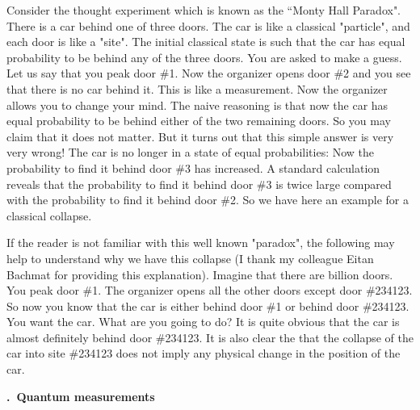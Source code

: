 \documentclass[onecolumn,fleqn, 11pt]{revtex4}
\renewcommand{\thesubsection}{\arabic{subsection}}
\renewcommand{\thesubsubsection}{\arabic{subsubsection}}
\newcommand{\sheadC}[1]
{
\addtocounter{subsubsection}{1}
\vspace{5mm}
{\bf \thesubsection.\thesubsubsection \ #1}  
\nopagebreak
\phantomsection
}
\begin{document}
Consider the thought experiment 
which is known as the ``Monty Hall Paradox".
There is a car behind one of three doors. 
The car is like a classical "particle", 
and each door is like a "site". 
The initial classical state is such that 
the car has equal probability to be behind 
any of the three doors. You are asked to make a guess.
Let us say that you peak door \#1. Now the organizer 
opens door \#2 and you see that there is no car behind it. 
This is like a measurement. Now the organizer allows 
you to change your mind. The naive reasoning is that 
now the car has equal probability to be behind either 
of the two remaining doors. So you may claim that 
it does not matter. But it turns out that this simple 
answer is very very wrong! The car is no longer 
in a state of equal probabilities: Now the probability 
to find it behind door \#3 has increased. A standard   
calculation reveals that the probability to find 
it behind door \#3 is twice large compared with 
the probability to find it behind door \#2.
So we have here an example for a classical collapse. 

If the reader is not familiar with this well known "paradox", 
the following may help to understand why we have this 
collapse (I thank my colleague Eitan Bachmat for providing 
this explanation).  Imagine that there are billion doors. 
You peak door \#1. The organizer opens all the other doors 
except door \#234123. So now you know that the 
car is either behind door \#1 or behind door \#234123. 
You want the car. What are you going to do?    
It is quite obvious that the car is almost definitely 
behind door \#234123. It is also clear the that 
the collapse of the car into site \#234123 does not 
imply any physical change in the position of the car. 


\sheadC{Quantum measurements}
\end{document}
